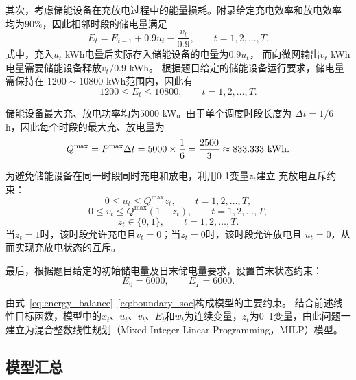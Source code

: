 其次，考虑储能设备在充放电过程中的能量损耗。附录给定充电效率和放电效率
均为$90\%$，因此相邻时段的储电量满足
\begin{equation}
E_t=E_{t-1}+0.9u_t-\frac{v_t}{0.9},
\qquad t=1,2,\ldots,T.
\label{eq:storage_balance}
\end{equation}
式中，充入$u_t$ kWh电量后实际存入储能设备的电量为$0.9u_t$，
而向微网输出$v_t$ kWh电量需要储能设备释放$v_t/0.9$ kWh。
根据题目给定的储能设备运行要求，储电量需保持在
$1200\sim10800$ kWh范围内，因此有
\begin{equation}
1200\leq E_t\leq10800,
\qquad t=1,2,\ldots,T.
\label{eq:storage_capacity}
\end{equation}

储能设备最大充、放电功率均为$5000$ kW。由于单个调度时段长度为
$\Delta t=1/6$ h，因此每个时段的最大充、放电量为
\begin{equation}
Q^{\max}
=P^{\max}\Delta t
=5000\times\frac{1}{6}
=\frac{2500}{3}
\approx833.333\ {\rm kWh}.
\label{eq:max_energy}
\end{equation}

为避免储能设备在同一时段同时充电和放电，利用0-1变量$z_t$建立
充放电互斥约束：
\begin{equation}
0\leq u_t\leq Q^{\max}z_t,
\qquad t=1,2,\ldots,T,
\label{eq:charge_constraint}
\end{equation}
\begin{equation}
0\leq v_t\leq Q^{\max}(1-z_t),
\qquad t=1,2,\ldots,T,
\label{eq:discharge_constraint}
\end{equation}
\begin{equation}
z_t\in\{0,1\},
\qquad t=1,2,\ldots,T.
\label{eq:binary_constraint}
\end{equation}
当$z_t=1$时，该时段允许充电且$v_t=0$；当$z_t=0$时，该时段允许放电且
$u_t=0$，从而实现充放电状态的互斥。

最后，根据题目给定的初始储电量及日末储电量要求，设置首末状态约束：
\begin{equation}
E_0=6000,\qquad E_T=6000.
\label{eq:boundary_soc}
\end{equation}

由式~\eqref{eq:energy_balance}--\eqref{eq:boundary_soc}构成模型的主要约束。
结合前述线性目标函数，模型中的$x_t$、$u_t$、$v_t$、$E_t$和$w_t$为连续变量，$z_t$为0--1变量，由此问题一建立为混合整数线性规划（Mixed Integer Linear Programming，MILP）模型。%


\subsection{模型汇总}


